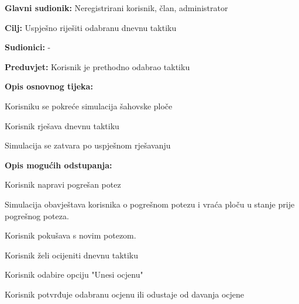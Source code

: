 					\noindent {}
					\begin{packed_item}
	
						\item \textbf{Glavni sudionik: } Neregistrirani korisnik, član, administrator
						\item  \textbf{Cilj: } Uspješno riješiti odabranu dnevnu taktiku
						\item  \textbf{Sudionici: }-
						\item  \textbf{Preduvjet: }Korisnik je prethodno odabrao taktiku
						\item  \textbf{Opis osnovnog tijeka:}
						
						\item[] \begin{packed_enum}
	
							\item Korisniku se pokreće simulacija šahovske ploče
							\item Korisnik rješava dnevnu taktiku
							\item Simulacija se zatvara po uspješnom rješavanju
							
						\end{packed_enum}
						
						\item  \textbf{Opis mogućih odstupanja:}
						
						\item[] \begin{packed_item}
	
							
							\item[2.a] Korisnik napravi pogrešan potez
							\item[] \begin{packed_enum}
								
								\item Simulacija obavještava korisnika o pogrešnom potezu i vraća ploču u stanje prije pogrešnog poteza.
								\item Korisnik pokušava s novim potezom.
								
								
							\end{packed_enum}
						
						\item[3.a] Korisnik želi ocijeniti dnevnu taktiku
						\item[] \begin{packed_enum}
							
							\item Korisnik odabire opciju "Unesi ocjenu"
							\item Korisnik potvrđuje odabranu ocjenu ili odustaje od davanja ocjene
							

\end{packed_enum}
\end{packed_item}
\end{packed_item}
